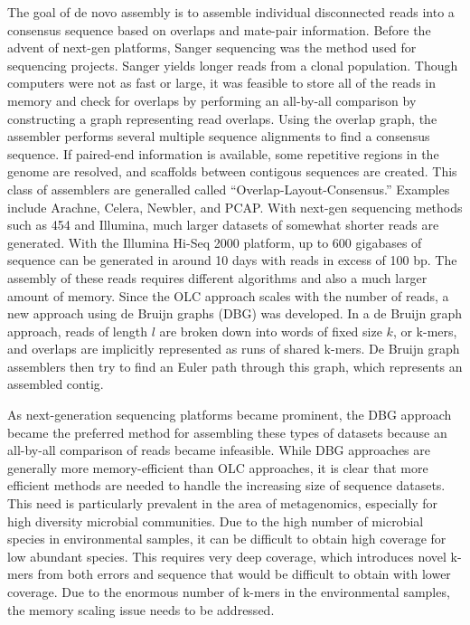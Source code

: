 \documentclass[12pt]{article} \usepackage{simplemargins}
\begin{document}
The goal of de novo assembly is to assemble individual disconnected
reads into a consensus sequence based on overlaps and mate-pair
information. Before the advent of next-gen platforms, Sanger
sequencing was the method used for sequencing projects.  Sanger yields
longer reads from a clonal population.  Though
computers were not as fast or large, it was feasible to
store all of the reads in memory and check for overlaps by performing
an all-by-all comparison by constructing a graph 
representing read overlaps\cite{assemblyreview}. Using the 
overlap graph, the assembler 
performs several multiple sequence alignments to find a consensus sequence. 
If paired-end information is available, some repetitive regions in the 
genome are resolved, and scaffolds between contigous sequences are 
created. This class of assemblers are generalled called 
``Overlap-Layout-Consensus.'' Examples include
Arachne\cite{arachne}, Celera\cite{celera}, Newbler\cite{newbler}, and 
PCAP\cite{pcap}. With next-gen sequencing 
methods such as 454 and Illumina, much larger datasets of somewhat shorter reads 
are generated. With the Illumina Hi-Seq 2000 platform, up to 600 
gigabases of sequence can be generated 
in around 10 days with reads in excess of 100 bp. The assembly of 
these reads requires different
algorithms and also a much larger amount of memory. Since the OLC
approach scales with the number of reads, a new approach using de Bruijn 
graphs (DBG) was developed\cite{pmid11504945}.
In a de Bruijn
graph approach, reads of length $l$ are broken down into words of fixed
size $k$, or k-mers, and overlaps are implicitly represented as runs of shared k-mers.
De Bruijn graph assemblers then try to find an Euler path through
this graph, which represents an assembled contig\cite{assemblyreview}. 

As next-generation sequencing platforms became prominent, the DBG approach
became the preferred method for assembling these types of datasets
because an all-by-all comparison of reads became infeasible. While DBG
approaches are generally more memory-efficient than OLC approaches, it
is clear that more efficient methods are needed to handle the
increasing size of sequence datasets. This need is particularly
prevalent in the area of metagenomics, especially for high diversity
microbial communities. Due to the high number of microbial species 
in environmental samples, it can be difficult to obtain high coverage 
for low abundant species. This 
requires very deep coverage, which introduces novel k-mers from both 
errors and sequence that 
would be difficult to obtain with lower coverage. Due to the enormous 
number of k-mers in the 
environmental samples, the memory scaling issue needs to be addressed.
\end{document}
